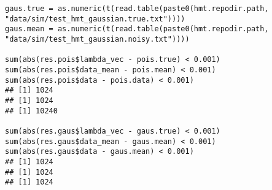 \documentclass[11pt]{article}
\begin{document}
\begin{lstlisting}
gaus.true = as.numeric(t(read.table(paste0(hmt.repodir.path, "data/sim/test_hmt_gaussian.true.txt"))))
gaus.mean = as.numeric(t(read.table(paste0(hmt.repodir.path, "data/sim/test_hmt_gaussian.noisy.txt"))))

sum(abs(res.pois$lambda_vec - pois.true) < 0.001)
sum(abs(res.pois$data_mean - pois.mean) < 0.001)
sum(abs(res.pois$data - pois.data) < 0.001)
## [1] 1024
## [1] 1024
## [1] 10240

sum(abs(res.gaus$lambda_vec - gaus.true) < 0.001)
sum(abs(res.gaus$data_mean - gaus.mean) < 0.001)
sum(abs(res.gaus$data - gaus.mean) < 0.001)
## [1] 1024
## [1] 1024
## [1] 1024
\end{lstlisting}
\end{document}
